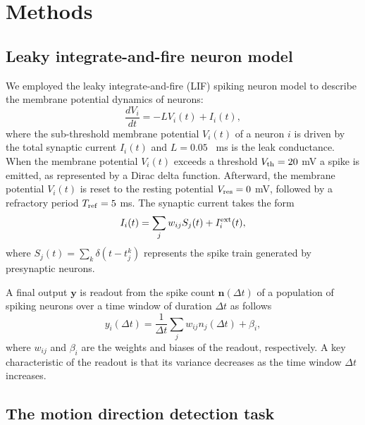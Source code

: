\section{Methods}
\subsection{Leaky integrate-and-fire neuron model}
We employed the leaky integrate-and-fire (LIF) spiking neuron model to describe the membrane potential dynamics of neurons:
\begin{equation}
    \dfrac{dV_i}{dt}= -LV_i(t) + I_i(t),
    \label{eq:LIF}
    \end{equation} 
where the sub-threshold membrane potential $V_i(t)$ of a neuron $i$ is driven by the total synaptic current $I_i(t)$ and $L=0.05$ \si{\per\milli\second} is the leak conductance. 
When the membrane potential $V_i(t)$ exceeds a threshold $V_{\rm th}=20$ \si{\milli\volt} a spike is emitted, as represented by a Dirac delta function. Afterward, the membrane potential $V_i(t)$ is reset to the resting potential $V_{\rm res}=0$ mV, followed by a refractory period $T_{\rm ref}=5$ ms. The synaptic current takes the form
\begin{equation}
    I_i(t)= \sum_{j}w_{ij}S_j(t)+I_i^{\rm ext}(t),
    \label{eq:current}
\end{equation}
where $S_j(t)=\sum_k \delta(t-t^k_j)$ represents the spike train generated by presynaptic neurons.

A final output $\mathbf{y}$ is readout from the spike count $\mathbf{n}(\Delta t)$ of a population of spiking neurons over a time window of duration $\Delta t$ as follows
\begin{equation}
y_i(\Delta t) = 
\frac{1}{\Delta t}\sum_{j} w_{ij}n_{j}(\Delta t) + \beta_i, %
\label{eq:snn_readout}
\end{equation}
where $w_{ij}$ and $\beta_i$ are the weights and biases of the readout, respectively. 
A key characteristic of the readout is that its variance decreases as the time window $\Delta t$ increases.



\subsection{The motion direction detection task}
